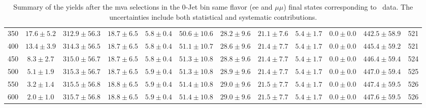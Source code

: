 \begin{table}[!ht]
{\begin{center}
\begin{tabular}{l c c c c c c c c c c c }
350 & $17.6\pm5.2$ & $312.9\pm56.3$ & $18.7\pm6.5$ & $5.8\pm0.4$ & $50.6\pm10.6$ & $28.2\pm9.6$ & $21.1\pm7.6$ & $5.4\pm1.7$ & $0.0\pm0.0$ & $442.5\pm58.9$ & 521 \\
400 & $13.4\pm3.9$ & $314.3\pm56.5$ & $18.7\pm6.5$ & $5.8\pm0.4$ & $51.1\pm10.7$ & $28.6\pm9.6$ & $21.4\pm7.7$ & $5.4\pm1.7$ & $0.0\pm0.0$ & $445.4\pm59.2$ & 521 \\
450 & $8.3\pm2.7$ & $315.0\pm56.7$ & $18.7\pm6.5$ & $5.8\pm0.4$ & $51.3\pm10.8$ & $28.8\pm9.6$ & $21.4\pm7.7$ & $5.4\pm1.7$ & $0.0\pm0.0$ & $446.4\pm59.4$ & 524 \\
500 & $5.1\pm1.9$ & $315.3\pm56.7$ & $18.7\pm6.5$ & $5.9\pm0.4$ & $51.3\pm10.8$ & $28.9\pm9.6$ & $21.4\pm7.7$ & $5.4\pm1.7$ & $0.0\pm0.0$ & $447.0\pm59.4$ & 525 \\
550 & $3.2\pm1.4$ & $315.5\pm56.8$ & $18.8\pm6.5$ & $5.9\pm0.4$ & $51.4\pm10.8$ & $29.0\pm9.6$ & $21.5\pm7.7$ & $5.4\pm1.7$ & $0.0\pm0.0$ & $447.4\pm59.5$ & 526 \\
600 & $2.0\pm1.0$ & $315.7\pm56.8$ & $18.8\pm6.5$ & $5.9\pm0.4$ & $51.4\pm10.8$ & $29.0\pm9.6$ & $21.5\pm7.7$ & $5.4\pm1.7$ & $0.0\pm0.0$ & $447.6\pm59.5$ & 526 \\
\hline
\end{tabular}
\end{center}
}
\caption{Summary of the yields after the mva selections in the 0-Jet bin same flavor (ee and $\mu\mu$) final states corresponding to \intlumi\ data. The uncertainties include 
both statistical and systematic contributions. }
\end{table}
